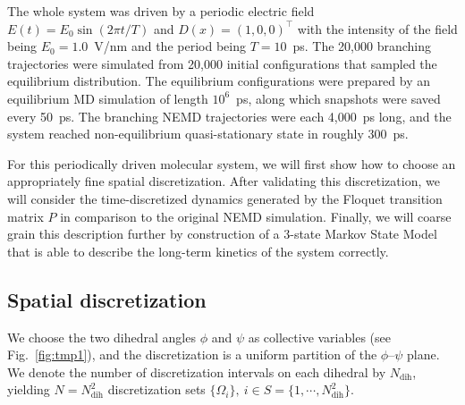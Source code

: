 \documentclass[journal=jctcce,manuscript=article]{achemso}
\newcommand{\redc}[1]{{\color{red} #1}}
\newcommand{\vect}[1]{#1}
\newcommand{\dih}{\textrm{dih}}
\begin{document}
The whole system was driven by a periodic electric field
$E(t) = E_0\sin(2\pi t/T)$ and $D(x) = (1,0,0)^{\top}$
with the intensity of the field being $E_0 = 1.0$~V/nm and the period being
$T = 10$~ps.
The 20,000 branching trajectories were simulated from 20,000
initial configurations that sampled the equilibrium distribution.
The equilibrium configurations were prepared by an equilibrium MD simulation
of length $10^6$~ps, along which snapshots were saved every 50~ps.
The branching NEMD
trajectories were each 4,000~ps long, and the system reached
non-equilibrium quasi-stationary state in roughly 300~ps.


For this periodically driven molecular system, we will first show how to choose an appropriately fine spatial discretization. After validating this discretization, we will consider
the time-discretized dynamics generated by the Floquet transition matrix $\vect P$
in comparison to the original NEMD simulation. Finally, we will coarse grain this description further by construction of a $3$-state Markov State Model that is able to describe the long-term kinetics of the system correctly. 

\subsection{Spatial discretization}

We choose the
two dihedral angles $\phi$ and $\psi$ as collective variables (see
Fig.~\ref{fig:tmp1}), and the discretization is a uniform partition of
the $\phi$--$\psi$ plane. We denote the number of discretization intervals on each
dihedral by $N_\dih$, yielding $N = N_\dih^2$ discretization sets 
$\{\Omega_i\},\ i\in S = \{1,\cdots,N_\dih^2\}$.
\end{document}
